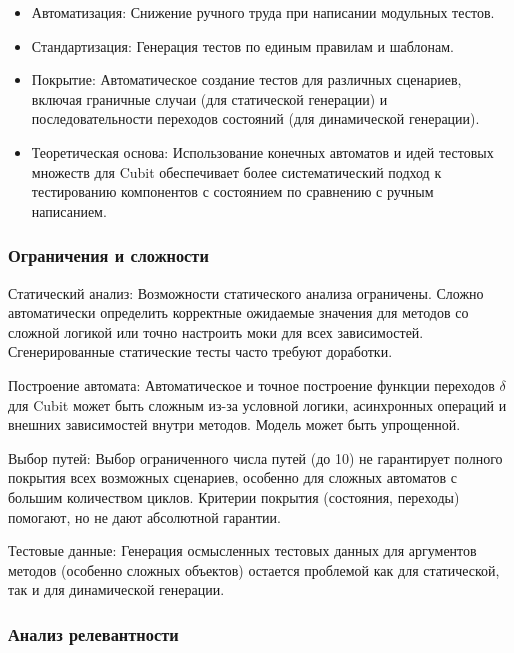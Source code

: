\documentclass[14pt, russian]{scrartcl}
\begin{document}
\begin{itemize}
    \item {Автоматизация:} Снижение ручного труда при написании модульных тестов.
    \item {Стандартизация:} Генерация тестов по единым правилам и шаблонам.
    \item {Покрытие:} Автоматическое создание тестов для различных сценариев, включая граничные случаи (для статической генерации) и последовательности переходов состояний (для динамической генерации).
    \item {Теоретическая основа:} Использование конечных автоматов и идей тестовых множеств для Cubit обеспечивает более систематический подход к тестированию компонентов с состоянием по сравнению с ручным написанием.
\end{itemize}

\subsubsection{Ограничения и сложности}

\begin{itemize*}
    \item {Статический анализ:} Возможности статического анализа ограничены. Сложно автоматически определить корректные ожидаемые значения для методов со сложной логикой или точно настроить моки для всех зависимостей. Сгенерированные статические тесты часто требуют доработки.
    \item {Построение автомата:} Автоматическое и точное построение функции переходов $\delta$ для Cubit может быть сложным из-за условной логики, асинхронных операций и внешних зависимостей внутри методов. Модель может быть упрощенной.
    \item {Выбор путей:} Выбор ограниченного числа путей (до 10) не гарантирует полного покрытия всех возможных сценариев, особенно для сложных автоматов с большим количеством циклов. Критерии покрытия (состояния, переходы) помогают, но не дают абсолютной гарантии.
    \item {Тестовые данные:} Генерация осмысленных тестовых данных для аргументов методов (особенно сложных объектов) остается проблемой как для статической, так и для динамической генерации.
\end{itemize*}

\subsubsection{Анализ релевантности}
\end{document}
